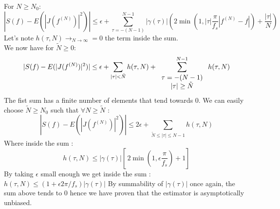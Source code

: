 \documentclass[11pt]{article}
\begin{document}
\begin{solution}
    For $N\geq N_0$:
    $$|S(f)-E(|J(f^{(N)})|^2)| \leq \epsilon + \sum_{\tau=-(N-1)}^{N-1}|\gamma(\tau)|(2\min(1,|\tau|\frac{\pi}{f_s}|f^{(N)}-f|)+\frac{|\tau|}{N}) $$
    Let's note $h(\tau,N)\rightarrow_{N\rightarrow \infty}=0$ the term inside the sum.\\
    We now have for $\tilde{N}\geq 0$:
    $$|S(f)-E(|J(f^{(N)})|^2)|\leq \epsilon + \sum_{|\tau|<\tilde{N}}h(\tau,N) + \sum_{\begin{tabular}{c}
    $\tau=-(N-1)$\\
    $|\tau|\geq \tilde{N}$
    \end{tabular}}^{N-1}h(\tau,N) $$
    The fist sum has a finite number of elements that tend towards 0. We can easily choose $\tilde{N}\geq N_0$ such that $\forall N \geq \tilde{N}$ :
    $$|S(f)-E(|J(f^{(N)})|^2)|\leq 2\epsilon + \sum_{\tilde{N}\leq |\tau|\leq N-1}h(\tau,N) $$
    Where inside the sum :
    $$h(\tau,N) \leq |\gamma(\tau)|[\,2\min(1,\epsilon \frac{\pi}{f_s})+1] $$
    By taking $\epsilon$ small enough we get inside the sum : $h(\tau,N)\leq (1+\epsilon 2\pi /f_s)|\gamma(\tau)|$
    By summability of $|\gamma(\tau)|$ once again, the sum above tends to 0 hence we have proven that the estimator is asymptotically unbiased.    

\end{solution}
\end{document}
